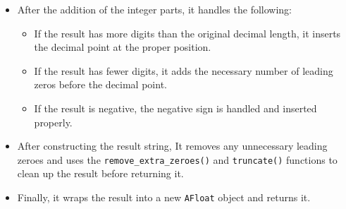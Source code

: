 \documentclass{article}
\begin{document}
\begin{itemize}
    \item After the addition of the integer parts, it handles the following:
        \begin{itemize}
            \item If the result has more digits than the original decimal length, it inserts the decimal point at the proper position.
            \item If the result has fewer digits, it adds the necessary number of leading zeros before the decimal point.
            \item If the result is negative, the negative sign is handled and inserted properly.
        \end{itemize}
    \item After constructing the result string, It removes any unnecessary leading zeroes and uses the \texttt{remove\_extra\_zeroes()} and \texttt{truncate()} functions to clean up the result before returning it.
    \item Finally, it wraps the result into a new \texttt{AFloat} object and returns it.
\end{itemize}
\end{document}
